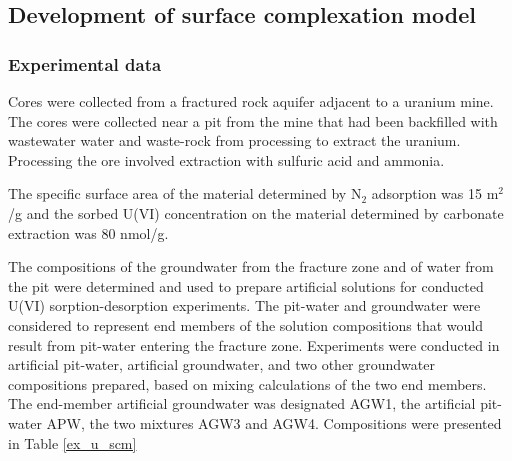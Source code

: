 \subsection{Development of surface complexation model}

\subsubsection{Experimental data}

Cores were collected from a fractured rock aquifer adjacent to a 
uranium mine. The cores were collected near a pit from the mine that had 
been backfilled with wastewater water and waste-rock from processing 
to extract the uranium. Processing the ore involved extraction 
with sulfuric acid and ammonia. 

The specific surface area of the material determined 
by N$_2$ adsorption was 15 m$^2$/g and the sorbed U(VI) 
concentration on the material determined by carbonate 
extraction \citep{KohlerMatthias2004MfEA} was 80 nmol/g.

The compositions of the groundwater from the fracture zone 
and of water from the pit were determined and used to 
prepare artificial solutions for conducted U(VI) sorption-desorption 
experiments.  The pit-water and groundwater were considered to 
represent end members of the solution compositions that would 
result from pit-water entering the fracture zone.  
Experiments were conducted in artificial pit-water, 
artificial groundwater, and two other groundwater compositions 
prepared, based on mixing calculations of the two end members.  
The end-member artificial groundwater was designated AGW1, 
the artificial pit-water APW, the two mixtures AGW3 and AGW4.  
Compositions were presented in Table \ref{ex_u_scm}

